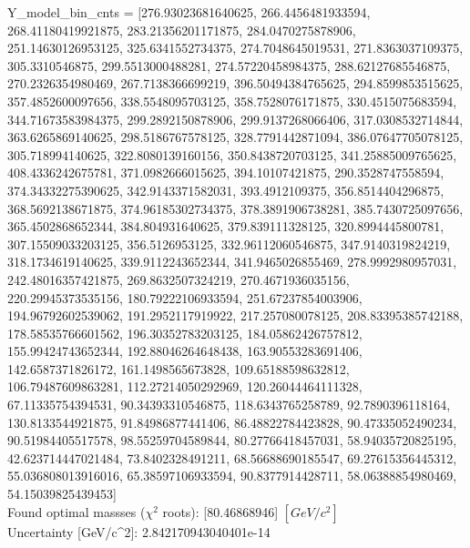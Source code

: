 \documentclass[12pt]{article}
\begin{document}
	Y\_model\_bin\_cnts = [276.93023681640625, 266.4456481933594, 268.41180419921875, 283.21356201171875, 284.0470275878906, 251.14630126953125, 325.6341552734375, 274.7048645019531, 271.8363037109375, 305.3310546875, 299.5513000488281, 274.57220458984375, 288.62127685546875, 270.2326354980469, 267.7138366699219, 396.50494384765625, 294.8599853515625, 357.4852600097656, 338.5548095703125, 358.7528076171875, 330.4515075683594, 344.71673583984375, 299.2892150878906, 299.9137268066406, 317.0308532714844, 363.6265869140625, 298.5186767578125, 328.7791442871094, 386.07647705078125, 305.718994140625, 322.8080139160156, 350.8438720703125, 341.25885009765625, 408.4336242675781, 371.0982666015625, 394.10107421875, 290.3528747558594, 374.34332275390625, 342.9143371582031, 393.4912109375, 356.8514404296875, 368.5692138671875, 374.96185302734375, 378.3891906738281, 385.7430725097656, 365.4502868652344, 384.804931640625, 379.839111328125, 320.8994445800781, 307.15509033203125, 356.5126953125, 332.96112060546875, 347.9140319824219, 318.1734619140625, 339.9112243652344, 341.9465026855469, 278.9992980957031, 242.48016357421875, 269.8632507324219, 270.4671936035156, 220.29945373535156, 180.79222106933594, 251.67237854003906, 194.96792602539062, 191.2952117919922, 217.257080078125, 208.83395385742188, 178.58535766601562, 196.30352783203125, 184.05862426757812, 155.99424743652344, 192.88046264648438, 163.90553283691406, 142.6587371826172, 161.1498565673828, 109.65188598632812, 106.79487609863281, 112.27214050292969, 120.26044464111328, 67.11335754394531, 90.34393310546875, 118.6343765258789, 92.7890396118164, 130.8133544921875, 91.84986877441406, 86.48822784423828, 90.47335052490234, 90.51984405517578, 98.55259704589844, 80.27766418457031, 58.94035720825195, 42.623714447021484, 73.8402328491211, 68.56688690185547, 69.27615356445312, 55.036808013916016, 65.38597106933594, 90.8377914428711, 58.06388854980469, 54.15039825439453]\\

    Found optimal massses ($\chi^2$ roots): [80.46868946] $[GeV/c^{2}]$\\
    Uncertainty [GeV/c^2]: 2.842170943040401e-14\\
\end{document}

